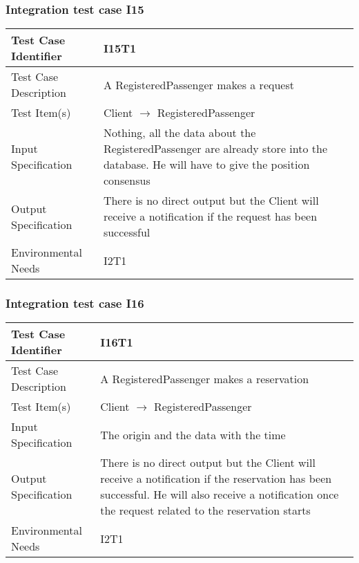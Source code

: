 		\subsubsection{Integration test case I15}
		\begin{center}
			\begin{tabular}{ |l p{10cm}| } \hline
				Test Case Identifier & I15T1 \\ \hline
				Test Case Description & A RegisteredPassenger makes a request \\ \hline
				Test Item(s) & Client $\rightarrow$ RegisteredPassenger \\ \hline
				Input Specification & Nothing, all the data about the RegisteredPassenger are already store into the database. He will have to give the position consensus\\ \hline
				Output Specification & There is no direct output but the Client will receive a notification if the request has been successful \\ \hline
				Environmental Needs & I2T1 \\ \hline
			\end{tabular}
		\end{center}
		\subsubsection{Integration test case I16}
		\begin{center}
			\begin{tabular}{ |l p{10cm}| } \hline
				Test Case Identifier & I16T1 \\ \hline
				Test Case Description & A RegisteredPassenger makes a reservation \\ \hline
				Test Item(s) & Client $\rightarrow$ RegisteredPassenger \\ \hline
				Input Specification & The origin and the data with the time \\ \hline
				Output Specification & There is no direct output but the Client will receive a notification if the reservation has been successful.
				He will also receive a notification once the request related to the reservation starts \\ \hline
				Environmental Needs & I2T1 \\ \hline
			\end{tabular}
		\end{center}
